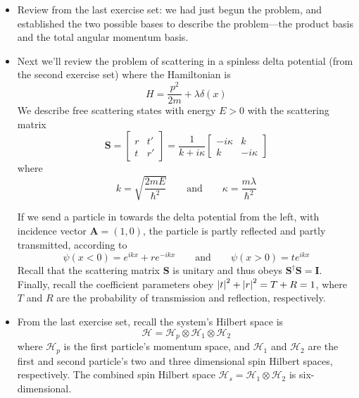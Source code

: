 \documentclass[11pt, a4paper]{article}
\newcommand{\eqtext}[1]{\qquad \text{#1} \qquad}
\renewcommand{\vec}[1]{\bm{#1}} %
\newcommand{\mat}[1]{\mathbf{#1}} %
\renewcommand{\H}{\mathcal{H}}  %
\begin{document}
\begin{itemize}
	\item Review from the last exercise set: we had just begun the problem, and established the two possible bases to describe the problem---the product basis and the total angular momentum basis.
	
	\item Next we'll review the problem of scattering in a spinless delta potential (from the second exercise set) where the Hamiltonian is
	\begin{equation*}
		H = \frac{p^{2}}{2m} + \lambda \delta (x)
	\end{equation*}
	We describe free scattering states with energy $ E > 0 $ with the scattering matrix
	\begin{equation*}
		\mat{S} = 
		\begin{bmatrix}
			r & t'\\
			t & r'
		\end{bmatrix}
		 = 
		 \frac{1}{k + i \kappa}
		 \begin{bmatrix}
		 	- i\kappa & k\\
		 	k	& - i\kappa
		 \end{bmatrix}
	\end{equation*}
	where 
	\begin{equation*}
		k = \sqrt{\frac{2mE}{\hbar^{2}}} \eqtext{and} \kappa = \frac{m\lambda}{\hbar^{2}} 
	\end{equation*}
	
	
	If we send a particle in towards the delta potential from the left, with incidence vector $ \vec{A} = (1, 0) $, the particle is partly reflected and partly transmitted, according to
	\begin{equation*}
		\psi(x < 0) = e^{ikx} + re^{-ikx} \eqtext{and} \psi(x>0) = te^{ikx}
	\end{equation*}
	Recall that the scattering matrix $ \mat{S} $ is unitary and thus obeys $ \mat{S}^{\dagger}\mat{S} = \mat{I} $. Finally, recall the coefficient parameters obey $ \abs{t}^{2} + \abs{r}^{2} = T + R = 1 $, where $ T $ and $ R $ are the probability of transmission and reflection, respectively.
	
	\item From the last exercise set, recall the system's Hilbert space is
	\begin{equation*}
		\H = \H_{p} \otimes \H_{1} \otimes \H_{2}
	\end{equation*}
	where $ \H_{p} $ is the first particle's momentum space, and $ \H_{1} $ and $ \H_{2} $ are the first and second particle's two and three dimensional spin Hilbert spaces, respectively. The combined spin Hilbert space $ \H_{s} = \H_{1} \otimes \H_{2} $ is six-dimensional.
	

\end{itemize}
\end{document}
